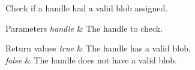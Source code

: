 Check if a handle had a valid blob assigned.


\begin{DoxyParams}{Parameters}
{\em handle} & The handle to check. \\
\hline
\end{DoxyParams}

\begin{DoxyRetVals}{Return values}
{\em true} & The handle has a valid blob. \\
\hline
{\em false} & The handle does not have a valid blob. \\
\hline
\end{DoxyRetVals}
